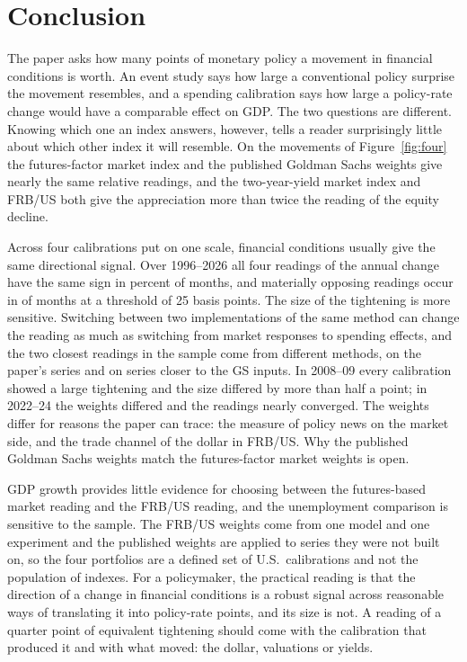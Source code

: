 \documentclass[11pt]{article}
\begin{document}
\FloatBarrier

\section{Conclusion}\label{sec:discussion}
The paper asks how many points of monetary policy a movement in financial conditions is worth. An event study says how large a conventional policy surprise the movement resembles, and a spending calibration says how large a policy-rate change would have a comparable effect on GDP. The two questions are different. Knowing which one an index answers, however, tells a reader surprisingly little about which other index it will resemble. On the movements of Figure~\ref{fig:four} the futures-factor market index and the published Goldman Sachs weights give nearly the same relative readings, and the two-year-yield market index and FRB/US both give the appreciation more than twice the reading of the equity decline.

Across four calibrations put on one scale, financial conditions usually give the same directional signal. Over 1996--2026 all four readings of the annual change have the same sign in  percent of months, and materially opposing readings occur in  of  months at a threshold of 25 basis points. The size of the tightening is more sensitive. Switching between two implementations of the same method can change the reading as much as switching from market responses to spending effects, and the two closest readings in the sample come from different methods, on the paper's series and on series closer to the GS inputs. In 2008--09 every calibration showed a large tightening and the size differed by more than half a point; in 2022--24 the weights differed and the readings nearly converged. The weights differ for reasons the paper can trace: the measure of policy news on the market side, and the trade channel of the dollar in FRB/US. Why the published Goldman Sachs weights match the futures-factor market weights is open.

GDP growth provides little evidence for choosing between the futures-based market reading and the FRB/US reading, and the unemployment comparison is sensitive to the sample. The FRB/US weights come from one model and one experiment and the published weights are applied to series they were not built on, so the four portfolios are a defined set of U.S.\ calibrations and not the population of indexes. For a policymaker, the practical reading is that the direction of a change in financial conditions is a robust signal across reasonable ways of translating it into policy-rate points, and its size is not. A reading of a quarter point of equivalent tightening should come with the calibration that produced it and with what moved: the dollar, valuations or yields.
\FloatBarrier
\end{document}
